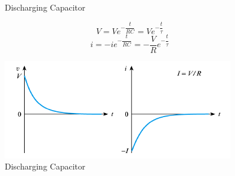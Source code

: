 \documentclass[UTF8]{article}
\begin{document}
\begin{itemize}
\begin{figure}[H]
\caption{Discharging Capacitor}
\end{figure}
$$V=Ve^{-\dfrac{t}{RC}}=Ve^{-\dfrac{t}{\tau}}$$
$$i=-ie^{-\dfrac{t}{RC}}=-\dfrac{V}{R}e^{-\dfrac{t}{\tau}}$$
\begin{figure}[H]
\centering
\includegraphics[scale=0.9]{a4.PNG}
\caption{Discharging Capacitor}
\end{figure}
\end{itemize}
\end{document}
